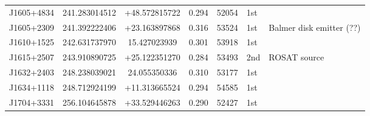 \begin{table*}
\begin{tabular} {l  cc  cc l l}
J1605+4834   &  241.283014512   &  +48.572815722     &  0.294    & 52054   &   1st    &     \\
J1605+2309   &  241.392222406   &  +23.163897868      &  0.316   & 53524   &   1st     &     Balmer disk emitter (??)  \\
J1610+1525   &  242.631737970   &   15.427023939       & 0.301     &53918    &   1st     &      \\
J1615+2507   &  243.910890725   &  +25.122351270     &0.284     & 53493    &  2nd      &  ROSAT source   \\
J1632+2403   &  248.238039021   &  24.055350336        &0.310    &53177     &   1st       &       \\
J1634+1118   &  248.712924199   &  +11.313665524      &0.294   & 54585     &  1st      &          \\
J1704+3331   & 256.104645878    &  +33.529446263     & 0.290    & 52427     &   1st    &            \\

\end{tabular}
\end{table*}
